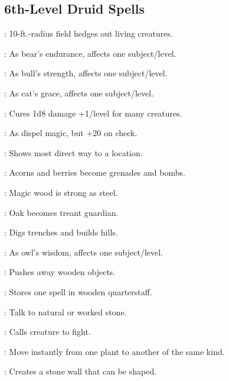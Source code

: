 \begin{multicols}{2}
\subsection{6th-Level Druid Spells}
\begin{description*}
\item[\linkspell{Antilife Shell}:] 10-ft.-radius field hedges out living creatures.
\item[\linkspell{Bear’s Endurance, Mass}:] As bear’s endurance, affects one subject/level.
\item[\linkspell{Bull’s Strength, Mass}:] As bull’s strength, affects one subject/level.
\item[\linkspell{Cat’s Grace, Mass}:] As cat’s grace, affects one subject/level.
\item[\linkspell{Cure Light Wounds, Mass}:] Cures 1d8 damage +1/level for many creatures.
\item[\linkspell{Dispel Magic, Greater}:] As dispel magic, but +20 on check.
\item[\linkspell{Find the Path}:] Shows most direct way to a location.
\item[\linkspell{Fire Seeds}:] Acorns and berries become grenades and bombs.
\item[\linkspell{Ironwood}:] Magic wood is strong as steel.
\item[\linkspell{Liveoak}:] Oak becomes treant guardian.
\item[\linkspell{Move Earth}:] Digs trenches and builds hills.
\item[\linkspell{Owl’s Wisdom, Mass}:] As owl’s wisdom, affects one subject/level.
\item[\linkspell{Repel Wood}:] Pushes away wooden objects.
\item[\linkspell{Spellstaff}:] Stores one spell in wooden quarterstaff.
\item[\linkspell{Stone Tell}:] Talk to natural or worked stone.
\item[\linkspell{Summon Nature’s Ally VI}:] Calls creature to fight.
\item[\linkspell{Transport via Plants}:] Move instantly from one plant to another of the same kind.
\item[\linkspell{Wall of Stone}:]  Creates a stone wall that can be shaped.
\end{description*}


\end{multicols}
